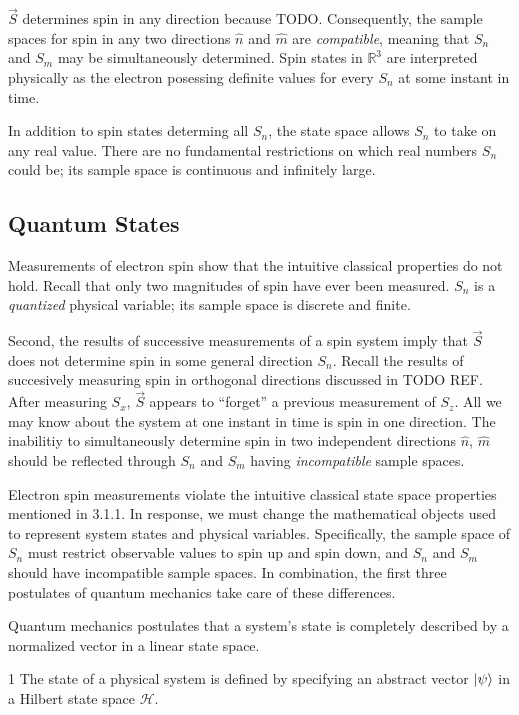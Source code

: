 $\vec{S}$ determines spin in any direction because TODO. Consequently, the sample spaces for spin in any two directions $\hat{n}$ and $\hat{m}$ are \textit{compatible}, meaning that $S_n$ and $S_m$ may be simultaneously determined. Spin states in $\mathbb{R}^3$ are interpreted physically as the electron posessing definite values for every $S_n$ at some instant in time.

In addition to spin states determing all $S_n$, the state space allows $S_n$ to take on any real value. There are no fundamental restrictions on which real numbers $S_n$ could be; its sample space is continuous and infinitely large.

\subsection{Quantum States}
Measurements of electron spin show that the intuitive classical properties do not hold. Recall that only two magnitudes of spin have ever been measured. $S_n$ is a \textit{quantized} physical variable; its sample space is discrete and finite.

Second, the results of successive measurements of a spin system imply that $\vec{S}$ does not determine spin in some general direction $S_n$. Recall the results of succesively measuring spin in orthogonal directions discussed in TODO REF. After measuring $S_x$, $\vec{S}$ appears to ``forget'' a previous measurement of $S_z$. All we may know about the system at one instant in time is spin in one direction. The inabilitiy to simultaneously determine spin in two independent directions $\hat{n}$, $\hat{m}$ should be reflected through $S_n$ and $S_m$ having \textit{incompatible} sample spaces.

Electron spin measurements violate the intuitive classical state space properties mentioned in 3.1.1. In response, we must change the mathematical objects used to represent system states and physical variables. Specifically, the sample space of $S_n$ must restrict observable values to spin up and spin down, and $S_n$ and $S_m$ should have incompatible sample spaces. In combination, the first three postulates of quantum mechanics take care of these differences.

Quantum mechanics postulates that a system's state is completely described by a normalized vector in a linear state space.

\begin{Thm:Postulate}{1}
    The state of a physical system is defined by specifying an abstract vector $\ket{\psi}$ in a Hilbert state space $\mathcal{H}$.
\end{Thm:Postulate}

